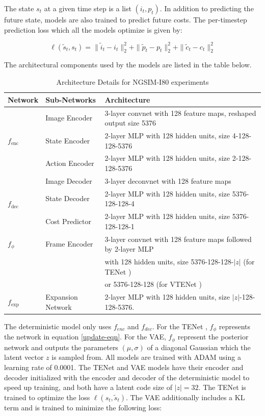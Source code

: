 \documentclass{article}
\newcommand{\modelname}{TENet }
\begin{document}
The state $s_t$ at a given time step is a list $(i_t, p_t)$. In addition to predicting the future state, models are also trained to predict future costs.
The per-timestep prediction loss which all the models optimize is given by:

\begin{equation}
\ell(\tilde{s}_t, s_t) = \|\tilde{i}_t - i_t \|_2^2 + \| \tilde{p}_t - p_t \|_2^2 + \| \tilde{c}_t - c_t \|_2^2
\end{equation}

The architectural components used by the models are listed in the table below.

\begin{table}[h]
  \caption{Architecture Details for NGSIM-I80 experiments}
  \label{sample-table}
  \centering
  \begin{tabular}{lll}
    \toprule
    Network & Sub-Networks     & Architecture    \\
    \midrule
    \multirow{3}{*}{$f_\text{enc}$} & Image Encoder & 3-layer convnet with 128 feature maps, reshaped output size 5376 \\
    & State Encoder & 2-layer MLP with 128 hidden units, size 4-128-128-5376 \\
    & Action Encoder & 2-layer MLP with 128 hidden units, size 2-128-128-5376  \\
    \hline
        \multirow{3}{*}{$f_\text{dec}$} & Image Decoder & 3-layer deconvnet with 128 feature maps \\
    & State Decoder & 2-layer MLP with 128 hidden units, size 5376-128-128-4 \\
        & Cost Predictor & 2-layer MLP with 128 hidden units, size 5376-128-128-1 \\
    \hline
    $f_\phi$ & Frame Encoder & 3-layer convnet with 128 feature maps followed by 2-layer MLP \\ & & with 128 hidden units, size 5376-128-128-$|z|$ (for \modelname) \\
    &               & or 5376-128-128 (for V\modelname) \\
    \hline
    $f_\text{exp}$ & Expansion Network & 2-layer MLP with 128 hidden units, size $|z|$-128-128-5376. \\
    \hline
    \bottomrule
  \end{tabular}
\end{table}


The deterministic model only uses $f_{enc}$ and $f_{dec}$.
For the \modelname, $f_\phi$ represents the network in equation \ref{update-eqn}.
For the VAE, $f_\phi$ represent the posterior network and outputs the parameters $(\mu, \sigma)$ of a diagonal Gaussian which the latent vector $z$ is sampled from.
All models are trained with ADAM \citep{ADAM} using a learning rate of 0.0001.
The \modelname and VAE models have their encoder and decoder initialized with the encoder and decoder of the deterministic model to speed up training, and both have a latent code size of $|z|=32$.
The \modelname is trained to optimize the loss $\ell(s_t, \tilde{s}_t)$.
The VAE additionally includes a KL term and is trained to minimize the following loss:
\end{document}
